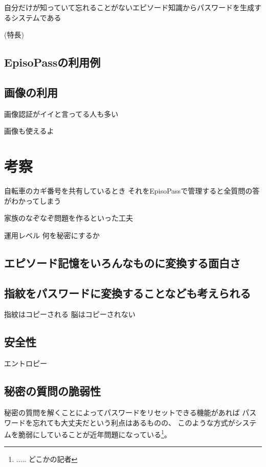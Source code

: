 \documentclass[twoside]{wiss}
\begin{document}
自分だけが知っていて忘れることがないエピソード知識からパスワードを生成するシステムである

(特長)

\subsection{EpisoPassの利用例}

\subsection{画像の利用}

画像認証がイイと言ってる人も多い

画像も使えるよ

\section{考察}

自転車のカギ番号を共有しているとき
それをEpisoPassで管理すると全質問の答がわかってしまう

家族のなぞなぞ問題を作るといった工夫

運用レベル
  何を秘密にするか


\subsection{エピソード記憶をいろんなものに変換する面白さ}

\subsection{指紋をパスワードに変換することなども考えられる}

指紋はコピーされる
脳はコピーされない

\subsection{安全性}

エントロピー

\subsection{秘密の質問の脆弱性}

秘密の質問を解くことによってパスワードをリセットできる機能があれば
パスワードを忘れても大丈夫だという利点はあるものの、
このような方式がシステムを脆弱にしていることが近年問題になっている\footnote{
  ..... どこかの記者
}。
\end{document}
